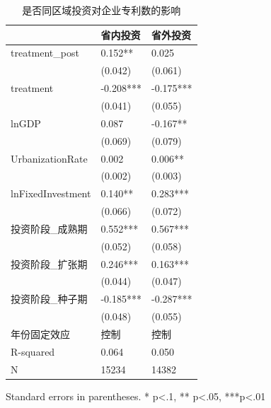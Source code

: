 \begin{table}
\caption{是否同区域投资对企业专利数的影响}
\label{}
\begin{center}
\begin{tabular}{lll}
\hline
                  & 省内投资      & 省外投资       \\
\hline
treatment\_post   & 0.152**     & 0.025      \\
                  & (0.042)   & (0.061)    \\
treatment         & -0.208*** & -0.175***  \\
                  & (0.041)   & (0.055)    \\
lnGDP             & 0.087     & -0.167**   \\
                  & (0.069)   & (0.079)    \\
UrbanizationRate              & 0.002     & 0.006**    \\
                  & (0.002)   & (0.003)    \\
lnFixedInvestment & 0.140**   & 0.283***   \\
                  & (0.066)   & (0.072)    \\
投资阶段\_成熟期         & 0.552***  & 0.567***   \\
                  & (0.052)   & (0.058)    \\
投资阶段\_扩张期         & 0.246***  & 0.163***   \\
                  & (0.044)   & (0.047)    \\
投资阶段\_种子期         & -0.185*** & -0.287***  \\
                  & (0.048)   & (0.055)    \\
年份固定效应  & 控制 & 控制\\ 
\hline

R-squared         & 0.064     & 0.050      \\
N                 & 15234     & 14382      \\
\hline
\end{tabular}
\end{center}
\end{table}
\bigskip
Standard errors in parentheses. \newline 
* p<.1, ** p<.05, ***p<.01

